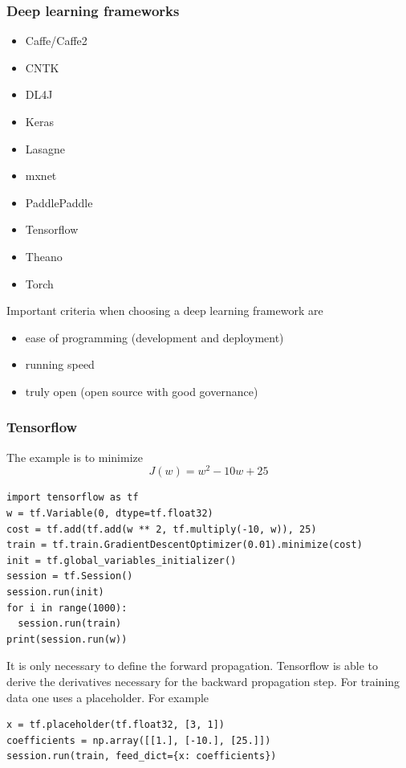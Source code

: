 \documentclass{article}
\begin{document}
\subsubsection{Deep learning frameworks}
\begin{itemize}
  \item Caffe/Caffe2
  \item CNTK
  \item DL4J
  \item Keras
  \item Lasagne
  \item mxnet
  \item PaddlePaddle
  \item Tensorflow
  \item Theano
  \item Torch
\end{itemize}
Important criteria when choosing a deep learning framework are
\begin{itemize}
  \item ease of programming (development and deployment)
  \item running speed
  \item truly open (open source with good governance)
\end{itemize}

\subsubsection{Tensorflow}
The example is to minimize
\begin{equation}
  J(w)=w^2-10w+25
\end{equation}
\begin{verbatim}
import tensorflow as tf
w = tf.Variable(0, dtype=tf.float32)
cost = tf.add(tf.add(w ** 2, tf.multiply(-10, w)), 25)
train = tf.train.GradientDescentOptimizer(0.01).minimize(cost)
init = tf.global_variables_initializer()
session = tf.Session()
session.run(init)
for i in range(1000):
  session.run(train)
print(session.run(w))
\end{verbatim}
It is only necessary to define the forward propagation.
Tensorflow is able to derive the derivatives necessary for the backward propagation step.
For training data one uses a placeholder. For example
\begin{verbatim}
x = tf.placeholder(tf.float32, [3, 1])
coefficients = np.array([[1.], [-10.], [25.]])
session.run(train, feed_dict={x: coefficients})
\end{verbatim}
\end{document}
